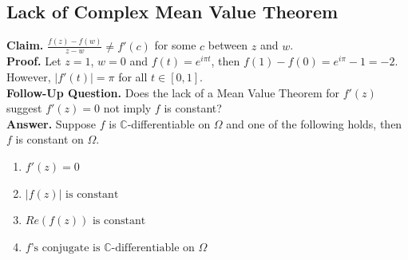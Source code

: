 \documentclass[11pt]{article}
\begin{document}
\subsection{Lack of Complex Mean Value Theorem}
\textbf{Claim.} $\frac{f(z) - f(w)}{z - w} \neq f'(c)$ for some $c$ between $z$ and $w$. \\
\textbf{Proof.} Let $z = 1$, $w = 0$ and $f(t) = e^{i\pi t}$, then $f(1) - f(0) = e^{i\pi} - 1 = -2$. However, $|f'(t)| = \pi$ for all $t \in [0, 1]$. \\
\textbf{Follow-Up Question.} Does the lack of a Mean Value Theorem for $f'(z)$ suggest $f'(z) = 0$ not imply $f$ is constant?  \\
\textbf{Answer.} Suppose $f$ is $\mathbb{C}$-differentiable on $\Omega$ and one of the following holds, then $f$ is constant on $\Omega$. 
\begin{enumerate}[leftmargin = *, nolistsep]
\item $f'(z) = 0$
\item $|f(z)| \text{ is constant}$
\item	$Re(f(z)) \text{ is constant}$
\item $f \text{'s conjugate is } \mathbb{C} \text{-differentiable on } \Omega$
\end{enumerate}
\end{document}
